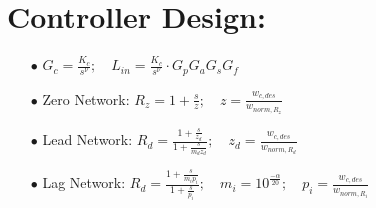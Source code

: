 \documentclass{article}
\begin{document}
	\section{Controller Design:}
	\begin{enumerate}
		\item[$\bullet$] $ G_c = \frac{K_c}{s^\nu}; \quad
		L_{in} = \frac{K_c}{s^\nu} \cdot G_pG_aG_sG_f $
		
		\item[$\bullet$] Zero Network: $ R_z = 1 + \frac{s}{z}; \quad
		z = \frac{w_{c,des}}{w_{norm,R_z}} $
		
		\item[$\bullet$] Lead Network: $ R_d = \frac{1 + \frac{s}{z_d}}{1 + \frac{s}{m_dz_d}}; \quad
		z_d = \frac{w_{c,des}}{w_{norm,R_d}} $
		
		\item[$\bullet$] Lag Network: $ R_d = \frac{1 + \frac{s}{m_ip_i}}{1 + \frac{s}{p_i}}; \quad
		m_i = 10^{\frac{-\alpha}{20}}; \quad
		p_i = \frac{w_{c,des}}{w_{norm,R_i}} $
		
	\end{enumerate}
	
\end{document}
